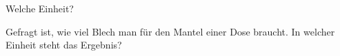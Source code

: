 \setcounter{aufgabe}{21}

\begin{aufgabe}{Welche Einheit?}
\begin{teile}
\teil Gefragt ist, wie viel Blech man für den Mantel einer Dose braucht. In welcher Einheit steht das Ergebnis? \\  \\  \\ 
\end{teile}
\end{aufgabe}

